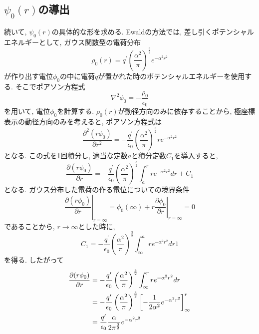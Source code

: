 \subsection{$\psi_{0}(r)$の導出}
続いて, $\psi_{0}(r)$の具体的な形を求める.
Ewaldの方法では, 差し引くポテンシャルエネルギーとして, ガウス関数型の電荷分布
\begin{equation}
    \rho_{0}(r)
  =
    q^{\prime} \left(\frac{\alpha^{2}}{\pi}\right)^{\frac{3}{2}} e^{-\alpha^{2} r^{2}}
  \label{eq:Ewald11}
\end{equation}
が作り出す電位$\phi_{0}$の中に電荷$q$が置かれた時のポテンシャルエネルギーを使用する.
そこでポアソン方程式
\begin{equation}
 \nabla^{2} \phi_{0} = - \frac{\rho_{0}}{\epsilon_{0}}
 \label{eq:Ewald12}
\end{equation}
を用いて, 電位$\phi_{0}$を計算する.
$\rho_{0}(r)$が動径方向のみに依存することから, 極座標表示の動径方向のみを考えると, ポアソン方程式は
\begin{equation}
    \frac{\partial^{2} (r \phi_{0})}{\partial r^{2}}
  =
   -\frac{q^{\prime}}{\epsilon_{0}}
    \left( \frac{\alpha^{2}}{\pi} \right)^{\frac{3}{2}} r e^{-\alpha^{2} r^{2}}
\label{eq:Ewald13}
\end{equation}
となる. この式を1回積分し, 適当な定数$a$と積分定数$C_{1}$を導入すると,
\begin{equation}
    \frac{\partial (r \phi_{0})}{\partial r}
  =
   -\frac{q^{\prime}}{\epsilon_{0}} \left( \frac{\alpha^{2}}{\pi} \right)^{\frac{3}{2}}
    \int_{a}^{r} r e^{-\alpha^{2} r^{2}} dr + C_{1}
\label{eq:Ewald14}
\end{equation}
となる. ガウス分布した電荷の作る電位についての境界条件
\begin{equation}
    \left.\frac{\partial (r \phi_{0})}{\partial r} \right|_{r=\infty}
  =
    \phi_{0}(\infty) + r \left.\frac{\partial \phi_{0}}{\partial r} \right|_{r=\infty}
  =
    0
\label{eq:Ewald15}
\end{equation}
であることから, $r \to \infty$とした時に,
\begin{equation}
    C_{1}
  =
    -\frac{q^{\prime}}{\epsilon_{0}} \left(\frac{\alpha^{2}}{\pi}\right)^{\frac{3}{2}}
     \int_{\infty}^{a} r e^{- \alpha^{2} r^{2}} dr1
  \label{eq:Ewald16}
\end{equation}
を得る. したがって
\begin{align}
     \frac{\partial (r \phi_{0})}{\partial r}
 &=
    -\frac{q^{\prime}}{\epsilon_{0}} \left( \frac{\alpha^{2}}{\pi} \right)^{\frac{3}{2}}
     \int_{\infty}^{r} r e^{-\alpha ^{2} r^{2}} dr
 \notag
 \\
 &=
   -\frac{q^{\prime}}{\epsilon_{0}} \left( \frac{\alpha^{2}}{\pi} \right)^{\frac{3}{2}}
    \left[
          -\frac{1}{2\alpha^{2}}e^{-\alpha^2 r^{2}}
    \right]^{r}_{\infty}
 \notag
 \\
 &=
    \frac{q^{\prime}}{\epsilon_{0}} \frac{\alpha}{2 \pi^{\frac{3}{2}}} e^{- \alpha^{2} r^{2}}
 \label{eq:Ewald17}
\end{align}
